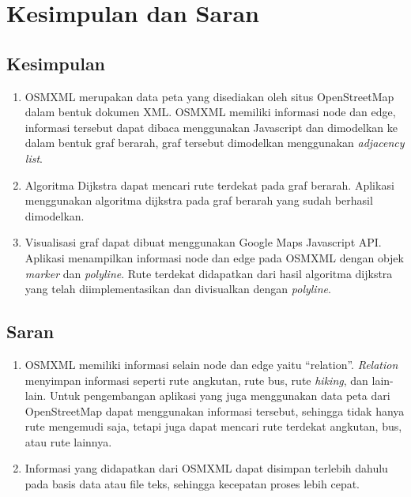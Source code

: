 \chapter{Kesimpulan dan Saran}
\section{Kesimpulan}
\begin{enumerate}
  \item OSMXML merupakan data peta yang disediakan oleh situs
  OpenStreetMap dalam bentuk dokumen XML. OSMXML memiliki informasi node dan
  edge, informasi tersebut dapat dibaca menggunakan Javascript dan dimodelkan 
  ke dalam bentuk graf berarah, graf tersebut dimodelkan menggunakan
  \textit{adjacency list}.
  
  \item Algoritma Dijkstra dapat mencari rute terdekat pada graf berarah.
  Aplikasi menggunakan algoritma dijkstra pada graf berarah yang sudah berhasil
  dimodelkan.
  
  \item Visualisasi graf dapat dibuat menggunakan Google Maps Javascript API.
  Aplikasi menampilkan informasi node dan edge pada OSMXML dengan objek
  \textit{marker} dan \textit{polyline}. Rute terdekat didapatkan dari hasil
  algoritma dijkstra yang telah diimplementasikan dan divisualkan dengan
  \textit{polyline}.
\end{enumerate}

\section{Saran}
\begin{enumerate}
\item OSMXML memiliki informasi selain node dan edge yaitu ``relation''.
\textit{Relation} menyimpan informasi seperti rute angkutan, rute bus, rute
\textit{hiking}, dan lain-lain. Untuk pengembangan aplikasi yang juga
menggunakan data peta dari OpenStreetMap dapat menggunakan informasi tersebut,
sehingga tidak hanya rute mengemudi saja, tetapi juga dapat mencari rute
terdekat angkutan, bus, atau rute lainnya.

\item Informasi yang didapatkan dari OSMXML dapat disimpan terlebih dahulu pada
basis data atau file teks, sehingga kecepatan proses lebih cepat.
\end{enumerate}